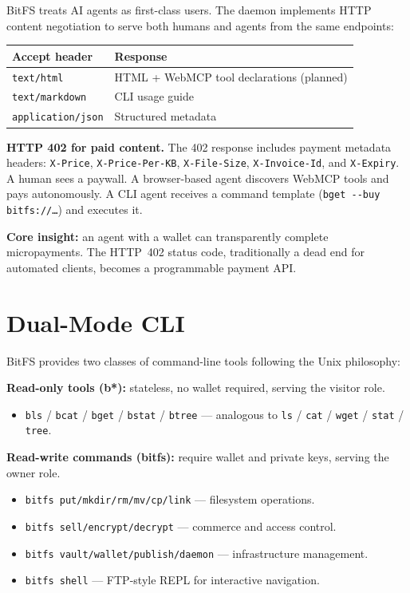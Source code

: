 \documentclass[11pt,a4paper]{article}
\begin{document}
BitFS treats AI agents as first-class users. The daemon implements HTTP content negotiation to serve both humans and agents from the same endpoints:

\begin{table}[h]
\centering
\begin{tabular}{@{}ll@{}}
\toprule
\textbf{Accept header} & \textbf{Response} \\
\midrule
\texttt{text/html} & HTML + WebMCP tool declarations (planned) \\
\texttt{text/markdown} & CLI usage guide \\
\texttt{application/json} & Structured metadata \\
\bottomrule
\end{tabular}
\end{table}

\textbf{HTTP 402 for paid content.} The 402 response includes payment metadata headers: \texttt{X-Price}, \texttt{X-Price-Per-KB}, \texttt{X-File-Size}, \texttt{X-Invoice-Id}, and \texttt{X-Expiry}. A human sees a paywall. A browser-based agent discovers WebMCP tools and pays autonomously. A CLI agent receives a command template (\texttt{bget -{}-buy bitfs://\ldots}) and executes it.

\textbf{Core insight:} an agent with a wallet can transparently complete micropayments. The HTTP~402 status code, traditionally a dead end for automated clients, becomes a programmable payment API.

\section{Dual-Mode CLI}

BitFS provides two classes of command-line tools following the Unix philosophy:

\textbf{Read-only tools (b*):} stateless, no wallet required, serving the visitor role.

\begin{itemize}
\item \texttt{bls} / \texttt{bcat} / \texttt{bget} / \texttt{bstat} / \texttt{btree} --- analogous to \texttt{ls} / \texttt{cat} / \texttt{wget} / \texttt{stat} / \texttt{tree}.
\end{itemize}

\textbf{Read-write commands (bitfs):} require wallet and private keys, serving the owner role.

\begin{itemize}
\item \texttt{bitfs put/mkdir/rm/mv/cp/link} --- filesystem operations.
\item \texttt{bitfs sell/encrypt/decrypt} --- commerce and access control.
\item \texttt{bitfs vault/wallet/publish/daemon} --- infrastructure management.
\item \texttt{bitfs shell} --- FTP-style REPL for interactive navigation.
\end{itemize}
\end{document}
